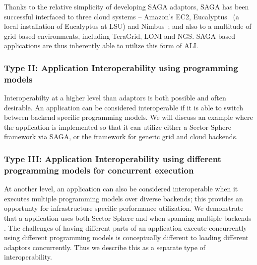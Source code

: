 \documentclass[3p,twocolumn]{elsarticle}
\begin{document}

Thanks to the relative simplicity of developing SAGA adaptors, SAGA
has been successful interfaced to three cloud systems -- Amazon's EC2,
Eucalyptus~\cite{eucalyptus} (a local installation of Eucalyptus at
LSU) and Nimbus~\cite{nimbus}; and also to a multitude of grid based
environments, including TeraGrid, LONI and NGS.  SAGA based
applications are thus inherently able to utilize this form of ALI.

\subsubsection{Type II: Application Interoperability using programming
  models} %
%
%

Interoperabilty at a higher level than adaptors is both possible and
often desirable. An application can be considered interoperable if it
is able to switch between backend specific programming models.  We
will discuss an example where the \wc application is implemented so
that it can utilize either a Sector-Sphere framework via SAGA, or the
\smr framework for generic grid and cloud backends. 

\subsubsection{Type III: Application Interoperability using different
  programming models for concurrent execution}
%
%

At another level, an application can also be considered interoperable
when it executes multiple programming models  over
diverse backends; this provides an opportunty for infrastructure
specific performance utilization.  We demonstrate that a \wc
application uses both Sector-Sphere and \smr when spanning multiple
backends .  The challenges of having different parts of
an application execute concurrently using different programming models
is conceptually different to loading different adaptors concurrently.
Thus we describe this as a separate type of interoperability.
\end{document}
